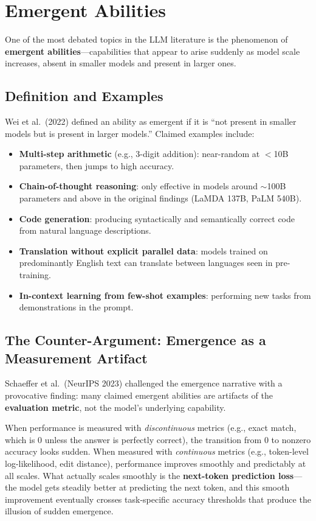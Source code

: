\section{Emergent Abilities}
\label{sec:emergent}

One of the most debated topics in the LLM literature is the phenomenon of
\textbf{emergent abilities}---capabilities that appear to arise suddenly as
model scale increases, absent in smaller models and present in larger ones.

\subsection{Definition and Examples}

Wei et al.\ (2022) defined an ability as emergent if it is ``not present in
smaller models but is present in larger models.''  Claimed examples include:

\begin{itemize}[leftmargin=*]
\item \textbf{Multi-step arithmetic} (e.g., 3-digit addition): near-random
  at $<$10B parameters, then jumps to high accuracy.
\item \textbf{Chain-of-thought reasoning}: only effective in models around
  $\sim$100B parameters and above in the original findings (LaMDA 137B,
  PaLM 540B).
\item \textbf{Code generation}: producing syntactically and semantically
  correct code from natural language descriptions.
\item \textbf{Translation without explicit parallel data}: models trained on
  predominantly English text can translate between languages seen in
  pre-training.
\item \textbf{In-context learning from few-shot examples}: performing new
  tasks from demonstrations in the prompt.
\end{itemize}

\subsection{The Counter-Argument: Emergence as a Measurement Artifact}

Schaeffer et al.\ (NeurIPS 2023) challenged the emergence narrative with a
provocative finding: many claimed emergent abilities are artifacts of the
\textbf{evaluation metric}, not the model's underlying capability.

\begin{keyinsight}
When performance is measured with \emph{discontinuous} metrics (e.g., exact
match, which is 0 unless the answer is perfectly correct), the transition
from 0 to nonzero accuracy looks sudden.  When measured with
\emph{continuous} metrics (e.g., token-level log-likelihood, edit distance),
performance improves smoothly and predictably at all scales.  What actually
scales smoothly is the \textbf{next-token prediction loss}---the model
gets steadily better at predicting the next token, and this smooth improvement
eventually crosses task-specific accuracy thresholds that produce the illusion
of sudden emergence.
\end{keyinsight}

